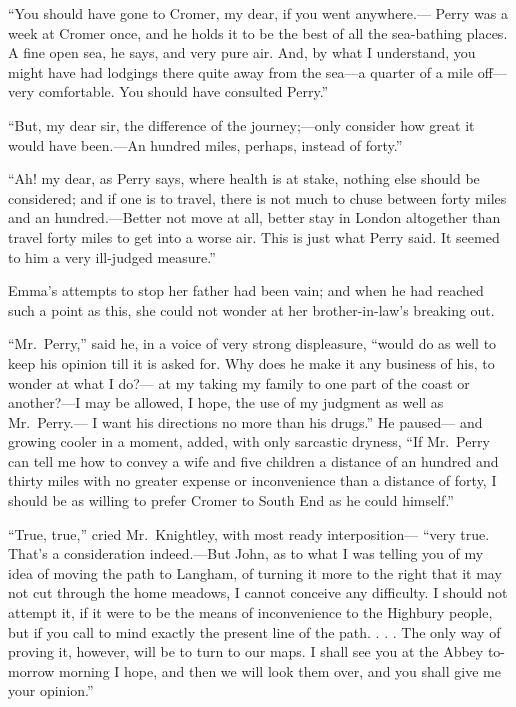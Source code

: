 ``You should have gone to Cromer, my dear, if you went anywhere.---%
Perry was a week at Cromer once, and he holds it to be the best
of all the sea-bathing places.  A fine open sea, he says, and very
pure air.  And, by what I understand, you might have had lodgings there
quite away from the sea---a quarter of a mile off---very comfortable.
You should have consulted Perry.''

``But, my dear sir, the difference of the journey;---only consider how
great it would have been.---An hundred miles, perhaps, instead of forty.''

``Ah! my dear, as Perry says, where health is at stake, nothing else
should be considered; and if one is to travel, there is not much
to chuse between forty miles and an hundred.---Better not move at all,
better stay in London altogether than travel forty miles to get
into a worse air.  This is just what Perry said.  It seemed to him
a very ill-judged measure.''

Emma's attempts to stop her father had been vain; and when he
had reached such a point as this, she could not wonder at her
brother-in-law's breaking out.

``Mr.\ Perry,'' said he, in a voice of very strong displeasure,
``would do as well to keep his opinion till it is asked for.
Why does he make it any business of his, to wonder at what I do?---%
at my taking my family to one part of the coast or another?---I may
be allowed, I hope, the use of my judgment as well as Mr.\ Perry.---%
I want his directions no more than his drugs.''  He paused---%
and growing cooler in a moment, added, with only sarcastic dryness,
``If Mr.\ Perry can tell me how to convey a wife and five children
a distance of an hundred and thirty miles with no greater expense
or inconvenience than a distance of forty, I should be as willing to
prefer Cromer to South End as he could himself.''

``True, true,'' cried Mr.\ Knightley, with most ready interposition---%
``very true.  That's a consideration indeed.---But John, as to what I
was telling you of my idea of moving the path to Langham, of turning
it more to the right that it may not cut through the home meadows,
I cannot conceive any difficulty.  I should not attempt it,
if it were to be the means of inconvenience to the Highbury people,
but if you call to mind exactly the present line of the path. . . .
The only way of proving it, however, will be to turn to our maps.
I shall see you at the Abbey to-morrow morning I hope, and then we
will look them over, and you shall give me your opinion.''

